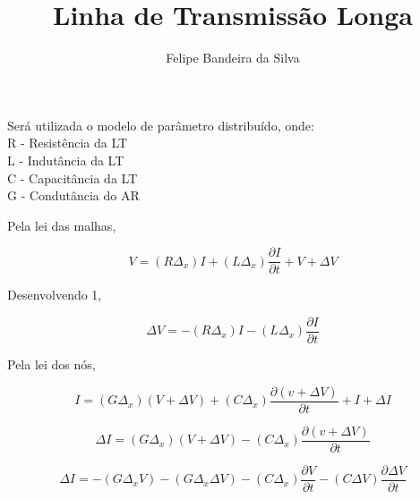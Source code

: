 \documentclass[a4paper, 10pt]{article}
\title{Linha de Transmissão Longa}
\author{Felipe Bandeira da Silva}
\begin{document}
\maketitle


Será utilizada o modelo de parâmetro distribuído, onde:\\
R - Resistência da LT\\
L - Indutância da LT\\
C - Capacitância da LT\\
G - Condutância do AR

\begin{center}
\end{center}

Pela lei das malhas,

\begin{equation}
V = (R \Delta_x) I + (L \Delta_x) \frac{\partial I}{\partial t} + V + \Delta V
\end{equation}

Desenvolvendo 1,

\begin{equation}
\Delta V = -(R \Delta_x) I - (L \Delta_x) \frac{\partial I}{\partial t}
\end{equation}

Pela lei dos nós,

\begin{equation}
I = (G \Delta_x)(V + \Delta V) + (C \Delta_x) \frac{\partial ( v +  \Delta V)}{\partial t} + I + \Delta I
\end{equation}

\begin{equation}
\Delta I = (G \Delta_x)(V + \Delta V) - (C \Delta_x) \frac{\partial (v + \Delta V)}{\partial t}
\end{equation}

\begin{equation}
\Delta I = - (G \Delta_x V) - (G \Delta_x \Delta V) - (C \Delta_x) \frac{\partial V}{\partial t} - (C \Delta V) \frac{\partial \Delta V}{\partial t}
\end{equation}
\end{document}

